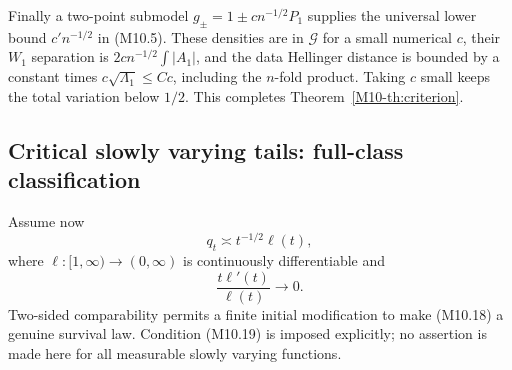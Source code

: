 \documentclass[11pt,a4paper]{article}
\theoremstyle{definition}\newtheorem{definition}[theorem]{Definition}
\theoremstyle{remark}\newtheorem{remark}[theorem]{Remark}
\numberwithin{equation}{section}
\begin{document}
Finally a two-point submodel $g_\pm=1\pm c n^{-1/2}P_1$ supplies the universal lower bound $c'n^{-1/2}$ in (M10.5). These densities are in $\mathcal G$ for a small numerical $c$, their $W_1$ separation is $2c n^{-1/2}\int|A_1|$, and the data Hellinger distance is bounded by a constant times $c\sqrt{\Lambda_1}\le Cc$, including the $n$-fold product. Taking $c$ small keeps the total variation below $1/2$. This completes Theorem~\ref{M10-th:criterion}.

\subsection{Critical slowly varying tails: full-class classification}\label{M10-sec-5}
Assume now
\[
 q_t\asymp t^{-1/2}\ell(t),\tag{M10.18}
\]
where $\ell:[1,\infty)\to(0,\infty)$ is continuously differentiable and
\[
 \frac{t\ell'(t)}{\ell(t)}\longrightarrow0.\tag{M10.19}
\]
Two-sided comparability permits a finite initial modification to make (M10.18) a genuine survival law. Condition (M10.19) is imposed explicitly; no assertion is made here for all measurable slowly varying functions.
\end{document}
